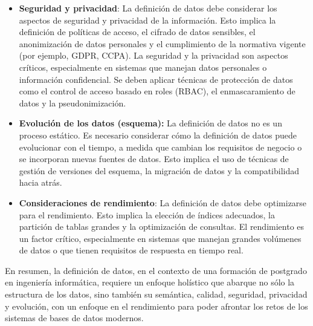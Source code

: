 \begin{itemize}
    \item \textbf{Seguridad y privacidad}:  La definición de datos debe considerar los aspectos de seguridad y privacidad de la información.  Esto implica la definición de políticas de acceso, el cifrado de datos sensibles, el anonimización de datos personales y el cumplimiento de la normativa vigente (por ejemplo, GDPR, CCPA). La seguridad y la privacidad son aspectos críticos, especialmente en sistemas que manejan datos personales o información confidencial.  Se deben aplicar técnicas de protección de datos como el control de acceso basado en roles (RBAC), el enmascaramiento de datos y la pseudonimización.

    \item \textbf{Evolución de los datos (esquema):} La definición de datos no es un proceso estático. Es necesario considerar cómo la definición de datos puede evolucionar con el tiempo, a medida que cambian los requisitos de negocio o se incorporan nuevas fuentes de datos.  Esto implica el uso de técnicas de gestión de versiones del esquema, la migración de datos y la compatibilidad hacia atrás.

    \item \textbf{Consideraciones de rendimiento}: La definición de datos debe optimizarse para el rendimiento. Esto implica la elección de índices adecuados, la partición de tablas grandes y la optimización de consultas.  El rendimiento es un factor crítico, especialmente en sistemas que manejan grandes volúmenes de datos o que tienen requisitos de respuesta en tiempo real.

\end{itemize}

En resumen, la definición de datos, en el contexto de una formación de postgrado en ingeniería informática, requiere un enfoque holístico que abarque no sólo la estructura de los datos, sino también su semántica, calidad, seguridad, privacidad y evolución, con un enfoque en el rendimiento para poder afrontar los retos de los sistemas de bases de datos modernos.
